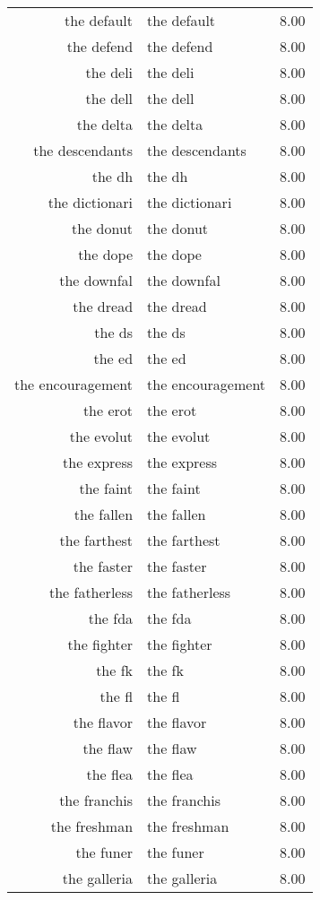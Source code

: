 \begin{table}[ht]
\begin{tabular}{rlr}
  the default & the default & 8.00 \\ 
  the defend & the defend & 8.00 \\ 
  the deli & the deli & 8.00 \\ 
  the dell & the dell & 8.00 \\ 
  the delta & the delta & 8.00 \\ 
  the descendants & the descendants & 8.00 \\ 
  the dh & the dh & 8.00 \\ 
  the dictionari & the dictionari & 8.00 \\ 
  the donut & the donut & 8.00 \\ 
  the dope & the dope & 8.00 \\ 
  the downfal & the downfal & 8.00 \\ 
  the dread & the dread & 8.00 \\ 
  the ds & the ds & 8.00 \\ 
  the ed & the ed & 8.00 \\ 
  the encouragement & the encouragement & 8.00 \\ 
  the erot & the erot & 8.00 \\ 
  the evolut & the evolut & 8.00 \\ 
  the express & the express & 8.00 \\ 
  the faint & the faint & 8.00 \\ 
  the fallen & the fallen & 8.00 \\ 
  the farthest & the farthest & 8.00 \\ 
  the faster & the faster & 8.00 \\ 
  the fatherless & the fatherless & 8.00 \\ 
  the fda & the fda & 8.00 \\ 
  the fighter & the fighter & 8.00 \\ 
  the fk & the fk & 8.00 \\ 
  the fl & the fl & 8.00 \\ 
  the flavor & the flavor & 8.00 \\ 
  the flaw & the flaw & 8.00 \\ 
  the flea & the flea & 8.00 \\ 
  the franchis & the franchis & 8.00 \\ 
  the freshman & the freshman & 8.00 \\ 
  the funer & the funer & 8.00 \\ 
  the galleria & the galleria & 8.00 \\ 

\end{tabular}
\end{table}
